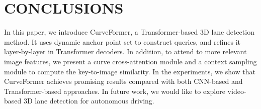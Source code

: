\documentclass[letterpaper, 10 pt, conference]{ieeeconf}
\begin{document}
\section{CONCLUSIONS}

In this paper, we introduce CurveFormer, a Transformer-based 3D lane detection method. It uses dynamic anchor point set to construct queries, and refines it layer-by-layer in Transformer decoders. In addition, to attend to more relevant image features, we present a curve cross-attention module and a context sampling module to compute the key-to-image similarity. 
In the experiments, we show that CurveFormer achieves promising results compared with both CNN-based and Transformer-based approaches. In future work, we would like to explore video-based 3D lane detection for autonomous driving.



































\end{document}
